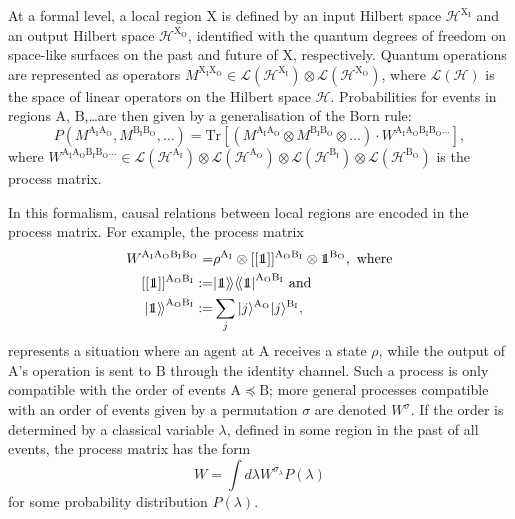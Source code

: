 \documentclass[a4paper,11pt]{article}
\newcommand\id{\leavevmode\hbox{\small1\kern-3.3pt\normalsize1}}
\newcommand{\tr}{\mbox{Tr}}
\newcommand{\Bra}[1]{{ \langle \! \langle{#1}\vert }}
\newcommand{\Ket}[1]{{ \vert {#1}  \rangle \!  \rangle}}
\newcommand{\bra}{\langle}
\newcommand{\ket}{\rangle}
\begin{document}
At a formal level, a local region $\mathrm X$ is defined by an input Hilbert space $\mathcal{H}^\mathrm{X_I}$ and an output Hilbert space $\mathcal{H}^\mathrm{X_O}$, identified with the quantum degrees of freedom on space-like surfaces on the past and future of $\mathrm X$, respectively. Quantum operations are represented as operators $M^\mathrm{X_I X_O} \in \mathcal{L}(\mathcal{H}^\mathrm{X_I})\otimes \mathcal{L}(\mathcal{H}^\mathrm{X_O})$, where $\mathcal{L}(\mathcal{H})$ is the space of linear operators on the Hilbert space $\mathcal{H}$. Probabilities for events in regions $\mathrm A$, $\mathrm B$,\dots are then given by a generalisation of the Born rule:
\begin{equation}
P(M^\mathrm{A_I A_O}, M^\mathrm{B_I B_O},\dots ) = \tr\left[\left(M^\mathrm{A_I A_O}\otimes M^\mathrm{B_I B_O}\otimes\dots\right)\cdot W^\mathrm{A_I A_O B_I B_O\dots}\right],
\label{processrule}
\end{equation}
where $W^\mathrm{A_I A_O B_I B_O\dots}\in \mathcal{L}(\mathcal{H}^\mathrm{A_I})\otimes \mathcal{L}(\mathcal{H}^\mathrm{A_O})\otimes\mathcal{L}(\mathcal{H}^\mathrm{B_I})\otimes \mathcal{L}(\mathcal{H}^\mathrm{B_O})$ is the {process matrix}.

In this formalism, causal relations between local regions are encoded in the process matrix. For example, the process matrix
\begin{align}
W^\mathrm{A_IA_OB_IB_O}=&\rho^\mathrm{A_I}\otimes [[\id]]^\mathrm{A_O B_I}\otimes \id^\mathrm{B_O}, \textrm{ where}\\
[[\id]]^\mathrm{A_O B_I} :=&  \Ket{\id}\Bra{\id}^\mathrm{A_O B_I} \textrm{ and} \\
\Ket{\id}^\mathrm{A_O B_I}:=& \sum_j |j\ket^\mathrm{A_O} |j\ket^\mathrm{B_I},
\end{align}
represents a situation where an agent at $\mathrm A$ receives a state $\rho$, while the output of $\mathrm A$'s operation is sent to $\mathrm B$ through the identity channel. Such a process is only compatible with the order of events $\mathrm{A\preceq B}$; more general processes compatible with an order of events given by a permutation $\sigma$ are denoted $W^{\sigma}$. If the order is determined by a classical variable $\lambda$, defined in some region in the past of all events, the process matrix has the form
\begin{equation}
W=\int d\lambda W^{\sigma_{\lambda}}P(\lambda)
\label{caussep}
\end{equation}
for some probability distribution $P(\lambda)$.
\end{document}
